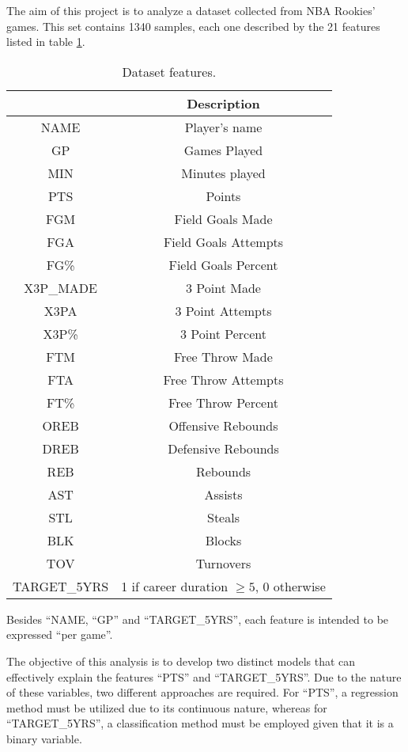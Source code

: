 The aim of this project is to analyze a dataset collected from NBA Rookies' games. This set contains 1340 samples, each one described by the 21 features listed in table \ref{tab:1}. 
\begin{table}[h]
	\centering
	\small
	\begin{tabular}{||c | c ||}
		\hline
		& Description\\
		\hline
		NAME & Player's name\\ 
		GP & Games Played\\ 
		MIN & Minutes played\\ 
		PTS & Points\\
		FGM & Field Goals Made\\
		FGA & Field Goals Attempts\\
		FG\% & Field Goals Percent\\
		X3P\_MADE & 3 Point Made\\
		X3PA & 3 Point Attempts\\
		X3P\% & 3 Point Percent\\
		FTM & Free Throw Made\\
		FTA & Free Throw Attempts\\
		FT\% & Free Throw Percent\\
		OREB & Offensive Rebounds\\
		DREB & Defensive Rebounds\\
		REB & Rebounds\\
		AST & Assists\\
		STL & Steals\\
		BLK & Blocks\\
		TOV & Turnovers\\
		TARGET\_5YRS & 1 if career duration $\geq 5$, 0 otherwise\\
		\hline
	\end{tabular}
	\caption{Dataset features.}
	\label{tab:1}
\end{table} 

Besides ``NAME, ``GP'' and ``TARGET\_5YRS'', each feature is intended to be expressed ``per game''.

The objective of this analysis is to develop two distinct models that can effectively explain the features ``PTS'' and ``TARGET\_5YRS''. Due to the nature of these variables, two different approaches are required. For ``PTS'', a regression method must be utilized due to its continuous nature, whereas for ``TARGET\_5YRS'', a classification method must be employed given that it is a binary variable.